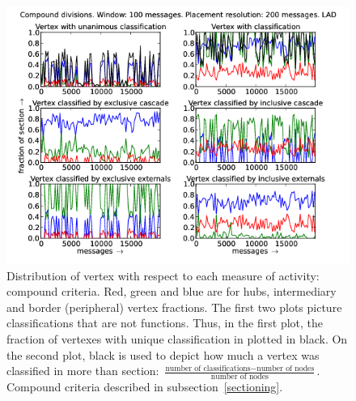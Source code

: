 \documentclass[%
 aip,
 jmp,%
 amsmath,amssymb,
 reprint,%
]{revtex4-1}
\begin{document}
\begin{figure}[hbtp] 
   \centering
        \includegraphics[width=\textwidth]{figs/LAD/100_2}
    \caption{Distribution of vertex with respect to each measure of activity: compound criteria. Red, green and blue are for hubs, intermediary and border (peripheral) vertex fractions. The first two plots picture classifications that are not functions. Thus, in the first plot, the fraction of vertexes with unique classification in plotted in black. On the second plot, black is used to depict how much a vertex was classified in more than section: $\frac{\text{number of classifications} - \text{number of nodes}}{\text{number of nodes}}$. Compound criteria described in subsection~\ref{sectioning}.}
    \label{fig:lad100_}
\end{figure}
\end{document}
